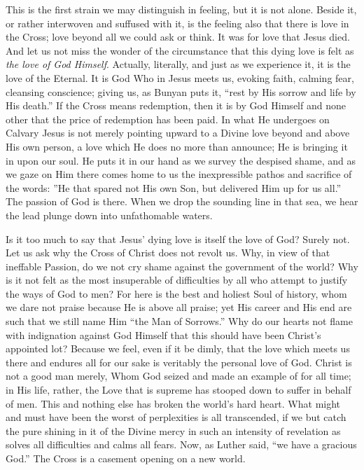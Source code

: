 \documentclass[12pt,a5paper,oneside]{book}
\begin{document}
This is the first strain we may distinguish in
feeling, but it is not alone. Beside it, or
rather interwoven and suffused with it, is the
feeling also that there is love in the Cross;
love beyond all we could ask or think. It was
for love that Jesus died. And let us not miss
the wonder of the circumstance that this dying
love is felt as \textit{the love of God Himself}. Actually,
literally, and just as we experience it, it is the love
of the Eternal. It is God Who in Jesus meets us,
evoking faith, calming fear, cleansing conscience;
giving us, as Bunyan puts it, ``rest by His
sorrow and life by His death.'' If the Cross means
redemption, then it is by God Himself and none
other that the price of redemption has been paid.
In what He undergoes on Calvary Jesus is not
merely pointing upward to a Divine love
beyond and above His own person, a love
which He does no more than announce; He is
bringing it in upon our soul. He puts it in
our hand as we survey the despised shame, and
as we gaze on Him there comes home to us the
inexpressible pathos and sacrifice of the words:
''He that spared not His own Son, but delivered
Him up for us all.'' The passion of God is there.
When we drop the sounding line in that sea, we
hear the lead plunge down into unfathomable
waters.

Is it too much to say that Jesus' dying love
is itself the love of God? Surely not. Let us
ask why the Cross of Christ does not revolt us.
Why, in view of that ineffable Passion, do we
not cry shame against the government of the
world? Why is it not felt as the most insuperable 
of difficulties by all who attempt to justify
the ways of God to men? For here is the
best and holiest Soul of history, whom we dare
not praise because He is above all praise;
yet His career and His end are such that we
still name Him ``the Man of Sorrows.'' Why
do our hearts not flame with indignation against
God Himself that this should have been
Christ's appointed lot? Because we feel, even
if it be dimly, that the love which meets us
there and endures all for our sake is veritably
the personal love of God. Christ is not a good
man merely, Whom God seized and made
an example of for all time; in His life, rather,
the Love that is supreme has stooped down to
suffer in behalf of men. This and nothing else
has broken the world's hard heart. What
might and must have been the worst of perplexities 
is all transcended, if we but catch
the pure shining in it of the Divine mercy in
such an intensity of revelation as solves all
difficulties and calms all fears. Now, as Luther
said, ``we have a gracious God.'' The Cross
is a casement opening on a new world.
\end{document}

